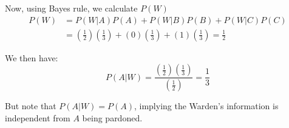 \documentclass{article}
\begin{document}
\begin{enumerate}
    Now, using Bayes rule, we calculate $P(W)$
    \begin{equation*}
    \begin{split}
        P(W) &= P(W|A)P(A)  + P(W|B)P(B) + P(W|C)P(C)\\
            &= \left(\frac{1}{2}\right)\left(\frac{1}{3}\right) + (0)\left(\frac{1}{3}\right) + (1)\left(\frac{1}{3}\right) = \frac{1}{2}
    \end{split}
    \end{equation*}

    We then have:
    \begin{equation*}
        P(A|W) = \frac{\left(\frac{1}{2}\right)\left(\frac{1}{3}\right)}{\left(\frac{1}{2}\right)} = \frac{1}{3}
    \end{equation*}

    But note that $P(A|W) = P(A)$, implying the Warden's information is independent from $A$ being pardoned.
\end{enumerate}
\end{document}
